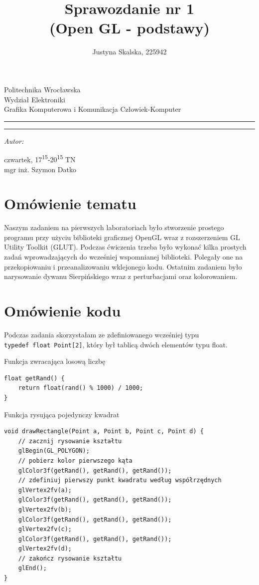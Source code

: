 \documentclass[12pt,a4paper,titlepage]{article}
\author{Justyna Skalska, 225942}
\title{Sprawozdanie nr 1\\
(Open GL - podstawy)}
\makeatletter
\newcommand{\linia}{\rule{\linewidth}{0.4mm}}
\renewcommand{\maketitle}{\begin{titlepage}
    \vspace*{1cm}
    \begin{center}\small
    Politechnika Wrocławska\\
    Wydział Elektroniki\\
    Grafika Komputerowa i Komunikacja Człowiek-Komputer
    \end{center}
    \vspace{3cm}
    \noindent\linia
    \begin{center}
      \LARGE \textsc{\@title}
         \end{center}
     \linia
    \vspace{0.5cm}
    \begin{flushright}
    \begin{minipage}{7cm}
    \textit{\small Autor:}\\
    \normalsize \textsc{\@author} \par
    \end{minipage}
    \vspace{5cm}

     {\small czwartek, 17\textsuperscript{15}-20\textsuperscript{15} TN}\\
        mgr inż. Szymon Datko
     \end{flushright}
    \vspace*{\stretch{6}}
    \begin{center}
    \@date
    \end{center}
  \end{titlepage}%
}
\makeatother
\begin{document}
\maketitle
\section{Omówienie tematu}
Naszym zadaniem na pierwszych laboratoriach było stworzenie prostego programu przy użyciu biblioteki graficznej OpenGL wraz z rozszerzeniem GL Utility Toolkit (GLUT). Podczas ćwiczenia trzeba było wykonać kilka prostych zadań wprowadzających do wcześniej wspomnianej biblioteki. Polegały one na przekopiowaniu i przeanalizowaniu wklejonego kodu. Ostatnim zadaniem było narysowanie dywanu Sierpińskiego wraz z perturbacjami oraz kolorowaniem.

\section{Omówienie kodu}
Podczas zadania skorzystałam ze zdefiniowanego wcześniej typu \\ \texttt{typedef float Point[2]}, który był tablicą dwóch elementów typu float. 

\begin{listing}[H]
\caption{Funkcja zwracająca losową liczbę}
\begin{verbatim}
float getRand() {
    return float(rand() % 1000) / 1000;
}
\end{verbatim}
\end{listing}

\begin{listing}[H]
\caption{Funkcja rysująca pojedynczy kwadrat}
\begin{verbatim}
void drawRectangle(Point a, Point b, Point c, Point d) {
    // zacznij rysowanie kształtu
    glBegin(GL_POLYGON);    
    // pobierz kolor pierwszego kąta
    glColor3f(getRand(), getRand(), getRand());
    // zdefiniuj pierwszy punkt kwadratu według współrzędnych
    glVertex2fv(a);
    glColor3f(getRand(), getRand(), getRand());
    glVertex2fv(b);
    glColor3f(getRand(), getRand(), getRand());
    glVertex2fv(c);
    glColor3f(getRand(), getRand(), getRand());
    glVertex2fv(d);
    // zakończ rysowanie kształtu
    glEnd();
}
\end{verbatim}
\end{listing}
\end{document}

